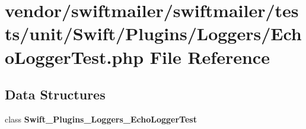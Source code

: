 \section{vendor/swiftmailer/swiftmailer/tests/unit/\+Swift/\+Plugins/\+Loggers/\+Echo\+Logger\+Test.php File Reference}
\label{_echo_logger_test_8php}
\subsection*{Data Structures}
\begin{DoxyCompactItemize}
\item 
class {\bf Swift\+\_\+\+Plugins\+\_\+\+Loggers\+\_\+\+Echo\+Logger\+Test}
\end{DoxyCompactItemize}
